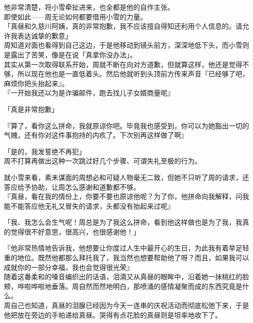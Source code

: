 他非常清楚，将小雪牵扯进来，也全都是他的自作主张。\\

即使如此——周无论如何都要借用小雪的力量。\\

「真昼和久慈川阿姨，真的非常抱歉，我不应该擅自得知还利用个人信息的。请允许我表达诚挚的歉意」\\

周知道对面也看得到自己这边，于是他移动到镜头前方，深深地低下头，而小雪则是露出了苦笑，像是在说「真拿你没办法」。\\

其实从第一次取得联系开始，周就不断在向对方道歉，但就算这样，他还是觉得不够，所以现在他也是一直低着头。然后他就听到头顶前方传来声音『已经够了吧，麻烦你把头抬起来』。\\

『一开始我还以为是诈骗邮件，跑去找儿子女婿商量呢』

「真是非常抱歉」

『算了，看你这么拼命，我就原谅你吧。毕竟我也感受到，你可以为她豁出一切的气魄，还有你对这件事抱持的内疚了。下次别再这样做了啊』

「是的，我发誓绝不再犯」\\

周不打算再做出这种一次跳过好几个步骤、可谓失礼至极的行为。

就小雪来看，素未谋面的周想必和可疑人物毫无二致，但她不只听了周的请求，还答应给予协助，让周怎么感谢和道歉都不够。\\

『真昼，看在我的情份上，你要不要也原谅他呢？为了你，他拼命向我解释，问我能不能答应他无礼又冒失的请求，头都没有抬起来过呢』

「我、我怎么会生气呢！周总是为了我这么拼命，看到他这样做也是为了我，我真的觉得很不好意思，很高兴，也很感谢他！」

『他非常热情地告诉我，他想要让你度过人生中最开心的生日，为此我有着举足轻重的地位。既然他都那么拜托我了，我当然也想要帮助他了呀？而且，如果我可以成就你的一部分幸福，我也会觉得很光荣』\\

随着这番柔和的嗓音编织出的话语，泪滴又从真昼的眼眸中，沿着她一抹桃红的脸颊，哗啦哗啦地垂落。周自然而然地明白，那喷涌的感情凝聚而成的东西究竟是什么。\\

周自己也知道，真昼的泪腺已经因为今天一连串的庆祝活动而彻底松弛下来，于是他把放在旁边的手帕递给真昼。哭得有点花脸的真昼则是坦率地收下了。\\

